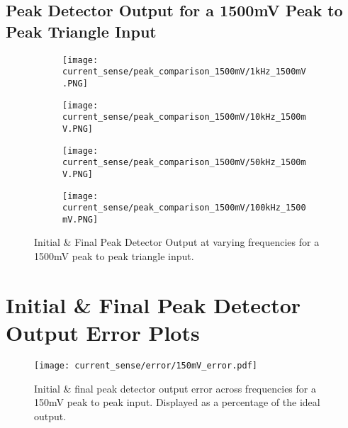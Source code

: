 \subsection{Peak Detector Output for a 1500mV Peak to Peak Triangle Input}
\begin{figure}[H]
    
    \centering
    \begin{subfigure}{0.45\textwidth}
        \texttt{[image: current\_sense/peak\_comparison\_1500mV/1kHz\_1500mV.PNG]}
    \end{subfigure}
    \begin{subfigure}{0.45\textwidth}
        \texttt{[image: current\_sense/peak\_comparison\_1500mV/10kHz\_1500mV.PNG]}
    \end{subfigure}
    \begin{subfigure}{0.45\textwidth}
        \texttt{[image: current\_sense/peak\_comparison\_1500mV/50kHz\_1500mV.PNG]}
    \end{subfigure}
    \begin{subfigure}{0.45\textwidth}
        \texttt{[image: current\_sense/peak\_comparison\_1500mV/100kHz\_1500mV.PNG]}
    \end{subfigure}
    \caption{Initial \& Final Peak Detector Output at varying frequencies for a 1500mV peak to peak triangle input.}
\end{figure}
    

\section{Initial \& Final Peak Detector Output Error Plots}\label{A:peak_detector_plots}

\begin{figure}[H]
    \begin{center}
        \texttt{[image: current\_sense/error/150mV\_error.pdf]}
        \caption{Initial \& final peak detector output error across frequencies for a 150mV peak to peak input. Displayed as a percentage of the ideal output.}
    \end{center}
\end{figure}


